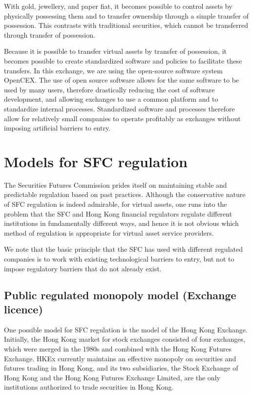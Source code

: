 With gold, jewellery, and paper fiat, it becomes possible to control
assets by physically possessing them and to transfer ownership through
a simple transfer of possession.  This contrasts with traditional
securities, which cannot be transferred through transfer of possession.

Because it is possible to transfer virtual assets by
transfer of possession, it becomes possible to create standardized
software and policies to facilitate these transfers.  In this exchange,
we are using the open-source software system OpenCEX.  The use of open
source software allows for the same software to be used by many users,
therefore drastically reducing the cost of software development, and
allowing exchanges to use a common platform and to standardize
internal processes.  Standardized software and processes therefore
allow for relatively small companies to operate profitably as
exchanges without imposing artificial barriers to entry.

\section{Models for SFC regulation}
The Securities Futures Commission prides itself on maintaining stable and
predictable regulation based on past practices.  Although the
conservative nature of SFC regulation is indeed admirable, for virtual
assets, one runs into the problem that the SFC and Hong Kong financial
regulators regulate different institutions in fundamentally different
ways, and hence it is not obvious which method of regulation is
appropriate for virtual asset service providers.

We note that the basic principle that the SFC has used with different
regulated companies is to work with existing technological barriers to
entry, but not to impose regulatory barriers that do not already
exist.

\subsection{Public regulated monopoly model (Exchange licence)}
One possible model for SFC regulation is the model of the Hong Kong
Exchange.  Initially, the Hong Kong market for stock exchanges consisted
of four exchanges, which were merged in the 1980s and combined with the
Hong Kong Futures Exchange.  HKEx currently maintains an effective
monopoly on securities and futures trading in Hong Kong, and its two
subsidiaries, the Stock Exchange of Hong Kong and the Hong Kong Futures
Exchange Limited, are the only institutions authorized to trade
securities in Hong Kong.

